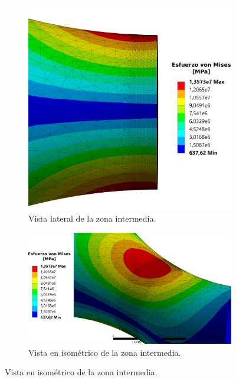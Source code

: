 \begin{figure}[p]
\centering
	\begin{subfigure}{0.7\linewidth}
		\centering
		\includegraphics[width=\linewidth]{Imagenes/esfvm_corte_lat201.pdf}
		\caption{Vista lateral de la zona intermedia.}
		\label{fig:corte_lat201}
	\end{subfigure}
	\begin{subfigure}{\linewidth}
		\centering
		\includegraphics[width=\linewidth]{Imagenes/esfvm_iso201}
		\caption{Vista en isométrico de la zona intermedia.}
		\label{fig:iso201}
	\end{subfigure}
\end{figure}
